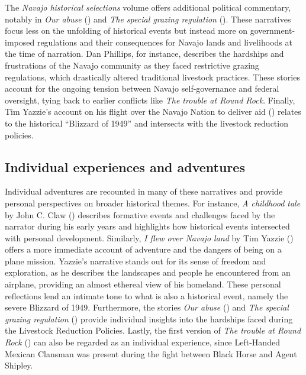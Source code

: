 The \textit{Navajo historical selections} volume offers additional political commentary, notably in \textit{Our abuse} () and \textit{The special grazing regulation} (). These narratives focus less on the unfolding of historical events but instead more on government-imposed regulations and their consequences for Navajo lands and livelihoods at the time of narration. Dan Phillips, for instance, describes the hardships and frustrations of the Navajo community as they faced restrictive grazing regulations, which drastically altered traditional livestock practices. These stories account for the ongoing tension between Navajo self-governance and federal oversight, tying back to earlier conflicts like \textit{The trouble at Round Rock}. Finally, Tim Yazzie's account on his flight over the Navajo Nation to deliver aid () relates to the historical ``Blizzard of 1949'' and intersects with the livestock reduction policies.

\subsection{Individual experiences and adventures}

Individual adventures are recounted in many of these narratives and provide personal perspectives on broader historical themes. For instance, \textit{A childhood tale} by John C. Claw () describes formative events and challenges faced by the narrator during his early years and highlights how historical events intersected with personal development. Similarly, \textit{I flew over Navajo land} by Tim Yazzie () offers a more immediate account of adventure and the dangers of being on a plane mission. Yazzie's narrative stands out for its sense of freedom and exploration, as he describes the landscapes and people he encountered from an airplane, providing an almost ethereal view of his homeland. These personal reflections lend an intimate tone to what is also a historical event, namely the severe Blizzard of 1949. Furthermore, the stories \textit{Our abuse} () and \textit{The special grazing regulation} () provide individual insights into the hardships faced during the Livestock Reduction Policies. Lastly, the first version of \textit{The trouble at Round Rock} () can also be regarded as an individual experience, since Left-Handed Mexican Clansman was present during the fight between Black Horse and Agent Shipley.

